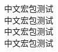\documentclass[12pt]{article}
\begin{document}
\begin{center}
\songti 中文宏包测试 \\
\heiti 中文宏包测试 \\
\fangsong 中文宏包测试 \\
\kaishu 中文宏包测试 \\
\end{center}
\end{document}
